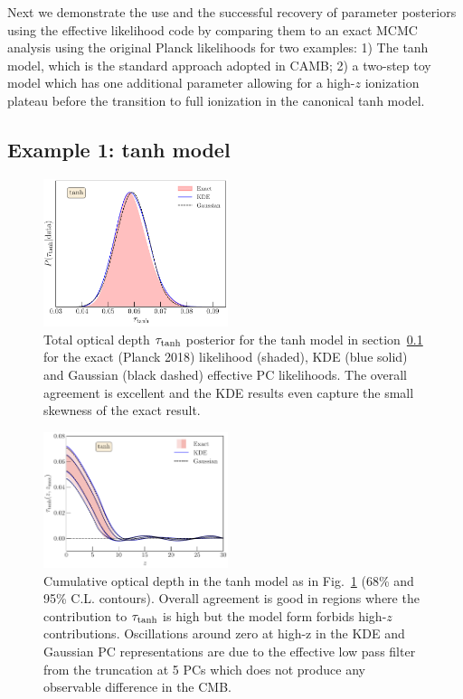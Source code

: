 \documentclass[aps,prd,twocolumn,amsmath,amssymb,showpacs,floatfix,superscriptaddress,nofootinbib]{revtex4-1}
\newcommand{\refsec}[1]{section~\ref{sec:#1}}
\begin{document}
Next we demonstrate the use and the successful recovery of parameter posteriors using the effective likelihood code by comparing them to an exact MCMC analysis using the original Planck likelihoods for two examples: 1) The tanh model, which is the standard approach adopted in CAMB; 2) a two-step toy model which has one additional parameter allowing for a high-$z$ ionization plateau before the transition to full ionization in the canonical tanh model.

\subsection{Example 1: tanh model}
\label{sec:example1}

\begin{figure}
\includegraphics[width=0.48\textwidth]
{pl18_tau_posterior_tanh_vs_tanh_kde_vs_tanh_gaussian_dz_auto_zre_prior_6p1_normalized_by_max.pdf}
\caption{Total optical depth $\tau_{\rm tanh}$ posterior for the tanh model in \refsec{example1} for the exact (Planck 2018) likelihood (shaded), KDE 
(blue solid) and  Gaussian (black dashed)
effective PC likelihoods. The overall agreement is excellent and the KDE results even capture the small skewness of the exact result.
}
\label{fig:tanh}

\end{figure}


\begin{figure}[ht]
\includegraphics[width=0.48\textwidth]{pl18_taugtz_tanh_direct_vs_kde_vs_gaussian.pdf}
\caption{Cumulative optical depth in the tanh model as in Fig.~\ref{fig:tanh}
(68\% and 95\% C.L. contours).  Overall agreement is good in regions where the contribution to $\tau_{\rm tanh}$ is high but the model form forbids high-$z$ contributions.    Oscillations around zero at high-z in the KDE and Gaussian PC representations are due to the effective low pass filter from the truncation at 5 PCs which does not produce any observable difference in the CMB. }
\label{fig:plot_taugtz_PC_vs_tanh}
\end{figure}
\end{document}
